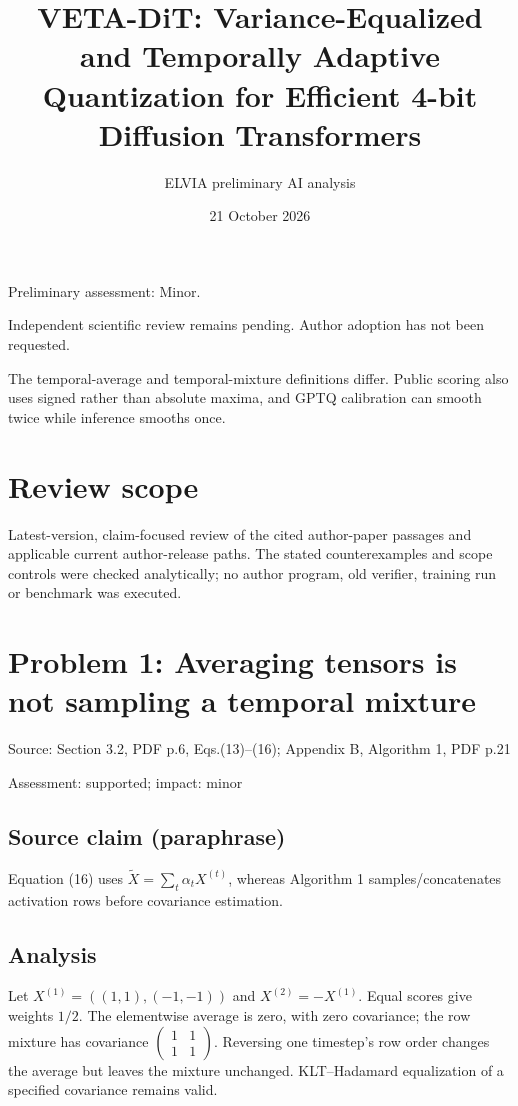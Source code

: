 \documentclass[11pt]{article}
\begin{document}
\title{VETA-DiT: Variance-Equalized and Temporally Adaptive Quantization for Efficient 4-bit Diffusion Transformers}

\author{ELVIA preliminary AI analysis}\date{21 October 2026}\maketitle

Preliminary assessment: Minor.\par

Independent scientific review remains pending. Author adoption has not been requested.

The temporal-average and temporal-mixture definitions differ. Public scoring also uses signed rather than absolute maxima, and GPTQ calibration can smooth twice while inference smooths once.

\section*{Review scope}

Latest-version, claim-focused review of the cited author-paper passages and applicable current author-release paths. The stated counterexamples and scope controls were checked analytically; no author program, old verifier, training run or benchmark was executed.

\section*{Problem 1: Averaging tensors is not sampling a temporal mixture}

Source: Section 3.2, PDF p.6, Eqs.(13)–(16); Appendix B, Algorithm 1, PDF p.21

Assessment: supported; impact: minor

\subsection*{Source claim (paraphrase)}

Equation (16) uses \(\tilde X=\sum_t\alpha_tX^{(t)}\), whereas Algorithm 1 samples/concatenates activation rows before covariance estimation.

\subsection*{Analysis}

Let \(X^{(1)}=((1,1),(-1,-1))\) and \(X^{(2)}=-X^{(1)}\). Equal scores give weights \(1/2\). The elementwise average is zero, with zero covariance; the row mixture has covariance \(\begin{pmatrix}1&1\\1&1\end{pmatrix}\). Reversing one timestep’s row order changes the average but leaves the mixture unchanged. KLT–Hadamard equalization of a specified covariance remains valid.
\end{document}
